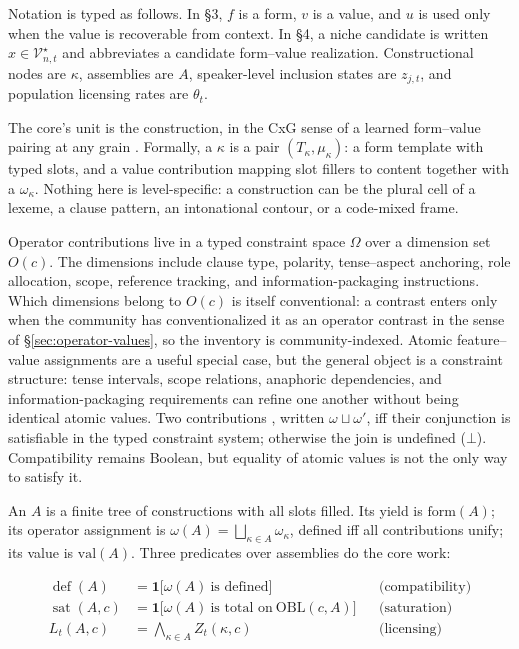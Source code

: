 Notation is typed as follows. In \S3, $f$ is a form, $v$ is a value, and $u$ is
used only when the value is recoverable from context. In \S4, a niche candidate
is written $x\in\mathcal{V}_{n,t}^{\star}$ and abbreviates a candidate
form--value realization. Constructional nodes are $\kappa$, assemblies are $A$,
speaker-level inclusion states are $z_{j,t}$, and population licensing rates are
$\theta_t$.

The core's unit is the construction, in the CxG sense of a learned form--value pairing at any grain \parencite{fillmore1988, goldberg1995constructions}. Formally, a  $\kappa$ is a pair $(T_\kappa, \mu_\kappa)$: a form template with typed slots, and a value contribution mapping slot fillers to content together with a  $\omega_\kappa$. Nothing here is level-specific: a construction can be the plural cell of a lexeme, a clause pattern, an intonational contour, or a code-mixed frame.

Operator contributions live in a typed constraint space $\Omega$ over a
dimension set $O(c)$. The dimensions include clause type, polarity,
tense--aspect anchoring, role allocation, scope, reference tracking, and
information-packaging instructions. Which dimensions belong to $O(c)$ is itself
conventional: a contrast enters only when the community has conventionalized it
as an operator contrast in the sense of \S\ref{sec:operator-values}, so the
inventory is community-indexed. Atomic feature--value assignments are a useful
special case, but the general object is a constraint structure: tense intervals,
scope relations, anaphoric dependencies, and information-packaging requirements
can refine one another without being identical atomic values. Two contributions
, written $\omega \sqcup \omega'$, iff their conjunction is
satisfiable in the typed constraint system; otherwise the join is undefined
($\bot$). Compatibility remains Boolean, but equality of atomic values is not
the only way to satisfy it.

An  $A$ is a finite tree of constructions with all slots filled. Its yield is $\mathrm{form}(A)$; its operator assignment is $\omega(A)=\bigsqcup_{\kappa\in A}\omega_\kappa$, defined iff all contributions unify; its value is $\mathrm{val}(A)$. Three predicates over assemblies do the core work:

\begin{align}
\operatorname{def}(A) &= \mathbf{1}\bigl[\omega(A)\ \text{is defined}\bigr]
  && \text{(compatibility)} \\
\operatorname{sat}(A,c) &= \mathbf{1}\bigl[\omega(A)\ \text{is total on}\
  \mathrm{OBL}(c,A)\bigr]
  && \text{(saturation)} \\
L_t(A,c) &= \textstyle\bigwedge_{\kappa\in A} Z_t(\kappa,c)
  && \text{(licensing)}
\end{align}

